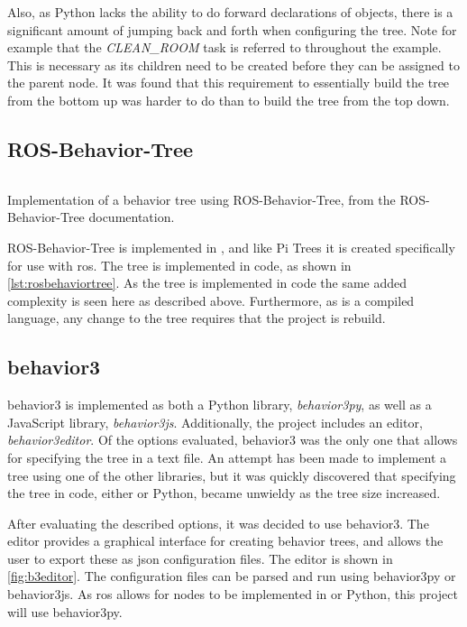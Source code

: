 \documentclass[\rootfolder/main.tex]{subfiles}
\begin{document}
Also, as Python lacks the ability to do forward declarations of objects, there is a significant amount of jumping back and forth when configuring the tree.
Note for example that the \emph{CLEAN\_ROOM} task is referred to throughout the example.
This is necessary as its children need to be created before they can be assigned to the parent node.
It was found that this requirement to essentially build the tree from the bottom up was harder to do than to build the tree from the top down.

\subsection{ROS-Behavior-Tree}

\begin{listing}
    \inputminted[fontsize=\scriptsize]{Python}{\rootfolder/Chapters/Chapter3/Listings/rosbehaviortree.cpp}
    \caption[Implementation of a behavior tree using ROS-Behavior-Tree.]{Implementation of a behavior tree using ROS-Behavior-Tree, from the ROS-Behavior-Tree documentation.}
    \label{lst:rosbehaviortree}
\end{listing}

ROS-Behavior-Tree is implemented in \CC, and like Pi Trees it is created specifically for use with \acrshort{ros}.
The tree is implemented in code, as shown in \cref{lst:rosbehaviortree}.
As the tree is implemented in code the same added complexity is seen here as described above.
Furthermore, as \CC is a compiled language, any change to the tree requires that the project is rebuild.

\subsection{behavior3}

behavior3 is implemented as both a Python library, \emph{behavior3py}, as well as a JavaScript library, \emph{behavior3js}.
Additionally, the project includes an editor, \emph{behavior3editor}.
Of the options evaluated, behavior3 was the only one that allows for specifying the tree in a text file.
An attempt has been made to implement a tree using one of the other libraries, but it was quickly discovered that specifying the tree in code, either \CC or Python, became unwieldy as the tree size increased.

After evaluating the described options, it was decided to use behavior3.
The editor provides a graphical interface for creating behavior trees, and allows the user to export these as \acrshort{json} configuration files.
The editor is shown in \cref{fig:b3editor}.
The configuration files can be parsed and run using behavior3py or behavior3js.
As \acrshort{ros} allows for nodes to be implemented in \CC or Python, this project will use behavior3py.
\end{document}
